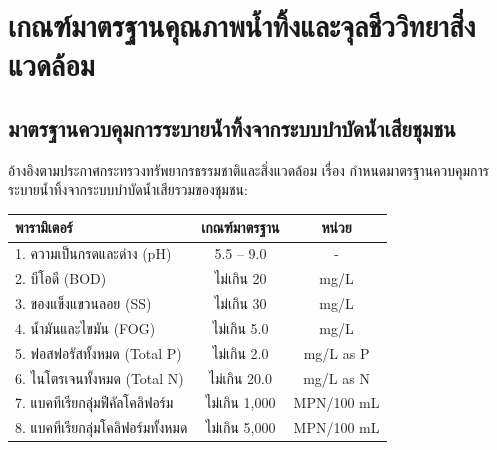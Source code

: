 \chapter{เกณฑ์มาตรฐานคุณภาพน้ำทิ้งและจุลชีววิทยาสิ่งแวดล้อม}
\label{app:appendixB}

\section{มาตรฐานควบคุมการระบายน้ำทิ้งจากระบบบำบัดน้ำเสียชุมชน}
อ้างอิงตามประกาศกระทรวงทรัพยากรธรรมชาติและสิ่งแวดล้อม เรื่อง กำหนดมาตรฐานควบคุมการระบายน้ำทิ้งจากระบบบำบัดน้ำเสียรวมของชุมชน:

\begin{table}[H]
\centering\small
\begin{tabularx}{\textwidth}{p{} c c}
\toprule
\textbf{พารามิเตอร์} & \textbf{เกณฑ์มาตรฐาน} & \textbf{หน่วย} \\
\midrule
1. ความเป็นกรดและด่าง (pH) & 5.5 -- 9.0 & - \\
2. บีโอดี (BOD) & ไม่เกิน 20 & mg/L \\
3. ของแข็งแขวนลอย (SS) & ไม่เกิน 30 & mg/L \\
4. น้ำมันและไขมัน (FOG) & ไม่เกิน 5.0 & mg/L \\
5. ฟอสฟอรัสทั้งหมด (Total P) & ไม่เกิน 2.0 & mg/L as P \\
6. ไนโตรเจนทั้งหมด (Total N) & ไม่เกิน 20.0 & mg/L as N \\
7. แบคทีเรียกลุ่มฟีคัลโคลิฟอร์ม & ไม่เกิน 1,000 & MPN/100 mL \\
8. แบคทีเรียกลุ่มโคลิฟอร์มทั้งหมด & ไม่เกิน 5,000 & MPN/100 mL \\
\bottomrule
\end{tabularx}
\end{table}
